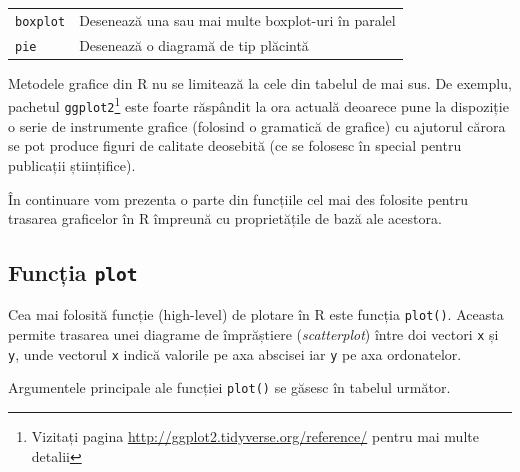 \documentclass[]{article}
\let\rmarkdownfootnote\footnote%
\def\footnote{\protect\rmarkdownfootnote}
\newcounter{exo}[section]
\begin{document}
\begin{longtable}[]{@{}ll@{}}
\begin{minipage}[t]{0.37\columnwidth}
\texttt{boxplot}\strut
\end{minipage} & \begin{minipage}[t]{0.34\columnwidth}\raggedright\strut
Desenează una sau mai multe boxplot-uri în paralel\strut
\end{minipage}\tabularnewline
\begin{minipage}[t]{0.37\columnwidth}\raggedright\strut
\texttt{pie}\strut
\end{minipage} & \begin{minipage}[t]{0.34\columnwidth}\raggedright\strut
Desenează o diagramă de tip plăcintă\strut
\end{minipage}\tabularnewline
\bottomrule
\end{longtable}

Metodele grafice din R nu se limitează la cele din tabelul de mai sus.
De exemplu, pachetul \texttt{ggplot2}\footnote{Vizitați pagina
  \url{http://ggplot2.tidyverse.org/reference/} pentru mai multe detalii}
este foarte răspândit la ora actuală deoarece pune la dispoziție o serie
de instrumente grafice (folosind o gramatică de grafice) cu ajutorul
cărora se pot produce figuri de calitate deosebită (ce se folosesc în
special pentru publicații științifice).

În continuare vom prezenta o parte din funcțiile cel mai des folosite
pentru trasarea graficelor în R împreună cu proprietățile de bază ale
acestora.

\subsection{\texorpdfstring{Funcția
\texttt{plot}}{Funcția plot}}\label{functia-plot}

Cea mai folosită funcție (high-level) de plotare în R este funcția
\texttt{plot()}. Aceasta permite trasarea unei diagrame de împrăștiere
(\emph{scatterplot}) între doi vectori \texttt{x} și \texttt{y}, unde
vectorul \texttt{x} indică valorile pe axa abscisei iar \texttt{y} pe
axa ordonatelor.

Argumentele principale ale funcției \texttt{plot()} se găsesc în tabelul
următor.
\end{document}
